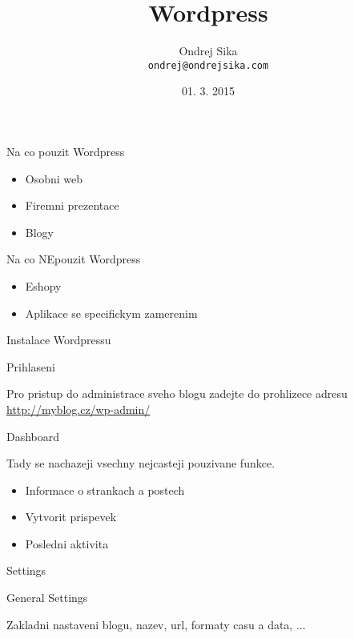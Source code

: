 \documentclass{beamer}
\title
    [Wordpress]
    {Wordpress}
\author
    [Ondrej Sika]
    {Ondrej Sika\\\texttt{ondrej@ondrejsika.com}}
\date
    {01. 3. 2015}
\begin{document}
\maketitle


\begin{frame}
    {Na co pouzit Wordpress}

    \begin{itemize}
        \item Osobni web
        \item Firemni prezentace
        \item Blogy
    \end{itemize}
\end{frame}


\begin{frame}
    {Na co NEpouzit Wordpress}

    \begin{itemize}
        \item Eshopy
        \item Aplikace se specifickym zamerenim
    \end{itemize}
\end{frame}


\begin{frame}
    {Instalace Wordpressu}
\end{frame}


\begin{frame}
    {Prihlaseni}

    Pro pristup do administrace sveho blogu zadejte do prohlizece adresu \url{http://myblog.cz/wp-admin/}
\end{frame}

\begin{frame}
    {Dashboard}

    Tady se nachazeji vsechny nejcasteji pouzivane funkce.

    \begin{itemize}
        \item Informace o strankach a postech
        \item Vytvorit prispevek
        \item Posledni aktivita
    \end{itemize}
\end{frame}


\begin{frame}
    {Settings}
\end{frame}


\begin{frame}
    {General Settings}

    Zakladni nastaveni blogu, nazev, url, formaty casu a data, ...
\end{frame}
\end{document}
